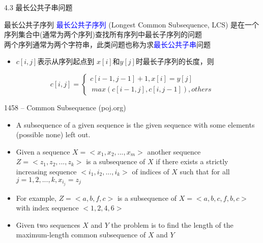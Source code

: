 \begin{frame}{4.3 最长公共子串问题}
    \begin{block}{最长公共子序列}
        \textcolor{blue}{最长公共子序列} (Longest Common Subsequence, LCS) 是在一个序列集合中(通常为两个序列)查找所有序列中最长子序列的问题\\
        两个序列通常为两个字符串，此类问题也称为求\textcolor{blue}{最长公共子串}问题
    \end{block}
    \begin{itemize}
        \item $c[i,j]$表示从序列起点到 $x[i]$和$y[j]$时最长子序列的长度，则
    \end{itemize}
    $$c[i,j]=\begin{cases} c[i-1,j-1]+1, x[i]=y[j] \\\ max(c[i-1,j],c[i,j-1]), others \end{cases}$$
    \begin{center}
    \end{center}
\end{frame}
\begin{frame}{1458 -- Common Subsequence (poj.org)}
    \begin{itemize}
        \item A subsequence of a given sequence is the given sequence with some elements (possible none) left out.
        \item Given a sequence $X=<x_1, x_2, ..., x_m>$ another sequence $Z=< z_1, z_2, ..., z_k>$ is a subsequence of $X$ if there exists a strictly increasing sequence $<i_1, i_2, ..., i_k>$ of indices of $X$ such that for all $j=1,2,...,k, x_{i_j}=z_j$
        \item For example, $Z=<a, b, f, c>$ is a subsequence of $X=<a, b, c, f, b, c>$ with	index sequence $<1, 2, 4, 6>$
        \item Given two sequences $X$ and $Y$ the problem is to find the length of the maximum-length common subsequence of $X$ and $Y$
    \end{itemize}
\end{frame}
